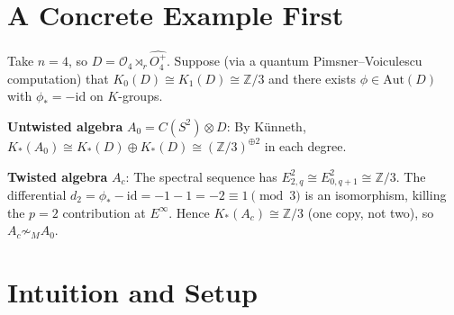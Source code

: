 \documentclass[11pt,a4paper]{article}
\theoremstyle{plain}
\theoremstyle{definition}
\theoremstyle{remark}
\begin{document}
\section{A Concrete Example First}
Take $n = 4$, so $D = \mathcal{O}_4 \rtimes_r \widehat{O_4^+}$.
Suppose (via a quantum Pimsner--Voiculescu computation) that
$K_0(D) \cong K_1(D) \cong \mathbb{Z}/3$ and there exists
$\phi \in \mathrm{Aut}(D)$ with $\phi_* = -\mathrm{id}$ on $K$-groups.

\medskip\noindent
\textbf{Untwisted algebra} $A_0 = C(S^2) \otimes D$:\;
By K\"unneth, $K_*(A_0) \cong K_*(D) \oplus K_*(D) \cong (\mathbb{Z}/3)^{\oplus 2}$ in each degree.

\medskip\noindent
\textbf{Twisted algebra} $A_c$:\;
The spectral sequence has $E^2_{2,q} \cong E^2_{0,q+1} \cong \mathbb{Z}/3$.
The differential $d_2 = \phi_* - \mathrm{id} = -1 - 1 = -2 \equiv 1 \pmod{3}$
is an isomorphism, killing the $p = 2$ contribution at $E^\infty$.
Hence $K_*(A_c) \cong \mathbb{Z}/3$ (one copy, not two), so $A_c \not\sim_M A_0$.

\section{Intuition and Setup}
\end{document}

